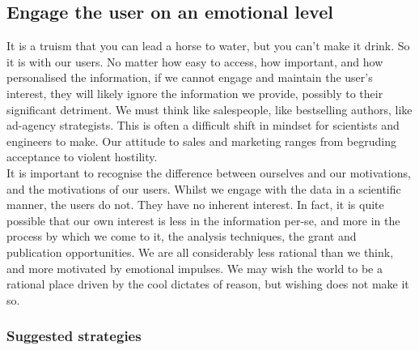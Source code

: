 \subsection{Engage the user on an emotional level}
It is a truism that you can lead a horse to water, but you can't make it drink. So it is with our users.
No matter how easy to access, how important, and how personalised the information, if we cannot engage and maintain the user's interest,
they will likely ignore the information we provide, possibly to their significant detriment.
We must think like salespeople, like bestselling authors, like ad-agency strategists.
This is often a difficult shift in mindset for scientists and engineers to make.
Our attitude to sales and marketing ranges from begruding acceptance to violent hostility. \\

It is important to recognise the difference between ourselves and our motivations, and the motivations of our users. Whilst we engage with the data in a scientific
manner, the users do not. They have no inherent interest. In fact, it is quite possible that our own interest is less in the information per-se, and more in the process
by which we come to it, the analysis techniques, the grant and publication opportunities. We are all considerably less rational than we think, and more motivated by
emotional impulses. We may wish the world to be a rational place driven by the cool dictates of reason, but wishing does not make it so. \\

\subsubsection*{Suggested strategies}

